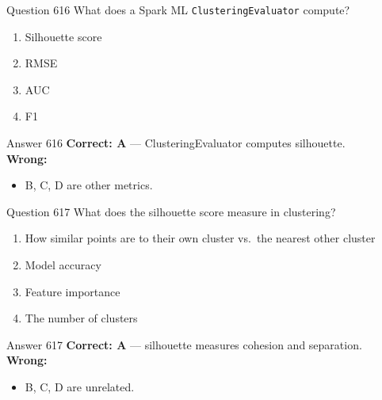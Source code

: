 \documentclass[aspectratio=169,11pt]{beamer}
\begin{document}
	\begin{frame}{Question 616}
		What does a Spark ML \texttt{ClusteringEvaluator} compute?
		\begin{enumerate}[label=\Alph*.]
			\item Silhouette score
			\item RMSE
			\item AUC
			\item F1
		\end{enumerate}
	\end{frame}
	\begin{frame}{Answer 616}
		\textbf{Correct: A} --- ClusteringEvaluator computes silhouette.\\
		\vspace{0.5em}
		\textbf{Wrong:}
		\begin{itemize}
			\item B, C, D are other metrics.
		\end{itemize}
	\end{frame}
	
	\begin{frame}{Question 617}
		What does the silhouette score measure in clustering?
		\begin{enumerate}[label=\Alph*.]
			\item How similar points are to their own cluster vs.\ the nearest other cluster
			\item Model accuracy
			\item Feature importance
			\item The number of clusters
		\end{enumerate}
	\end{frame}
	\begin{frame}{Answer 617}
		\textbf{Correct: A} --- silhouette measures cohesion and separation.\\
		\vspace{0.5em}
		\textbf{Wrong:}
		\begin{itemize}
			\item B, C, D are unrelated.
		\end{itemize}
	\end{frame}
	
\end{document}

